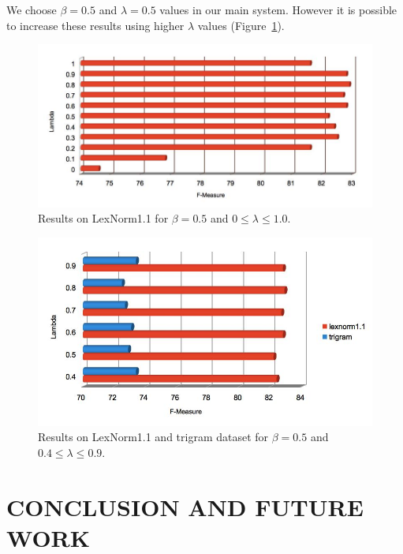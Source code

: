 \documentclass[a4paper,onesided,12pt]{report}
\begin{document}
We choose $\beta = 0.5$ and $\lambda = 0.5$ values in our main system. However it is possible to increase these results using higher $\lambda$ values (Figure~\ref{fig:lambdas}).

\begin{figure}[htb]
\begin{center}
\includegraphics[width=\linewidth]{fig/lambdasforbeta05}
\caption{Results on LexNorm1.1 for $\beta = 0.5$  and $0 \leq \lambda \leq 1.0$.}
\label{fig:lambdas}
\end{center}
\end{figure}

\begin{figure}[htb]
\begin{center}
\includegraphics[width=\linewidth]{fig/lambdas_han_penn}
\caption{Results on LexNorm1.1 and trigram dataset for $\beta = 0.5$  and $0.4 \leq \lambda \leq 0.9$.}
\label{fig:lamhanpenn}
\end{center}
\end{figure}

\chapter{CONCLUSION AND FUTURE WORK}
\end{document}
